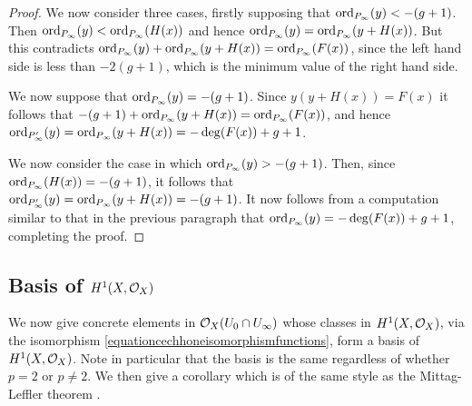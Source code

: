 \begin{proof}
    
    We now consider three cases, firstly supposing that $\operatorname{ord}_{P_\infty}(y) < -(g+1)$.
    Then $\operatorname{ord}_{P_\infty}(y) < \operatorname{ord}_{P_\infty}(H(x))$ and hence $ \operatorname{ord}_{P_\infty}(y) = \operatorname{ord}_{P_\infty}(y+H(x))$.
    But this contradicts $\operatorname{ord}_{P_\infty}(y) + \operatorname{ord}_{P_\infty}(y+H(x)) = \operatorname{ord}_{P_\infty}(F(x))$, since the left hand side is less than $-2(g+1)$, which is the minimum value of the right hand side.
    
    We now suppose that $\operatorname{ord}_{P_\infty} (y) = -(g+1)$. Since $y(y+H(x)) = F(x)$ it follows that $-(g+1) + \operatorname{ord}_{P_\infty}(y+H(x)) = \operatorname{ord}_{P_\infty}(F(x))$, and hence $\operatorname{ord}_{P_\infty'}(y) = \operatorname{ord}_{P_\infty}(y+H(x)) = -\deg(F(x)) + g + 1$.
    
    We now consider the case in which $\operatorname{ord}_{P_\infty}(y) > -(g+1)$.
    Then, since $\operatorname{ord}_{P_\infty}(H(x)) = -(g+1)$, it follows that $\operatorname{ord}_{P_\infty'}(y) = \operatorname{ord}_{P_\infty} (y+H(x)) = -(g+1)$.
    It now follows from a computation similar to that in the previous paragraph that $\operatorname{ord}_{P_\infty}(y) = -\deg(F(x)) + g +1$, completing the proof.
    \end{proof}

\subsection{Basis of $H^1(X,\mathcal{O}_X)$}

We now give concrete elements in ${\cal O}_X(U_0 \cap U_\infty)$ whose classes in $H^1(X,\mathcal{O}_X)$, via the isomorphism \eqref{equationcechhoneisomorphismfunctions}, form a basis of $H^1(X,\mathcal{O}_X)$.
Note in particular that the basis is the same regardless of whether $p=2$ or $p\neq 2$.
We then give a corollary which is of the same style as the Mittag-Leffler theorem \cite[Chap.\ 5, \S 2, Thm.\ 4]{ahlfors}.

